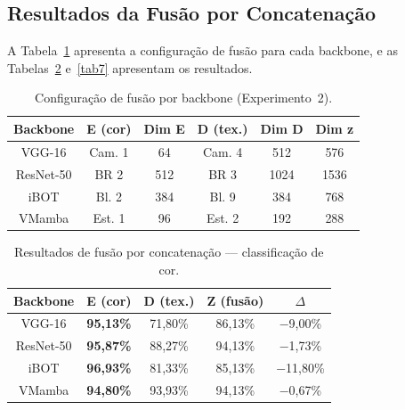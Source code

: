 \documentclass[letterpaper, 10 pt, conference]{ieeeconf}
\begin{document}
\subsection{Resultados da Fusão por Concatenação}

A Tabela~\ref{tab5} apresenta a configuração de fusão para cada backbone,
e as Tabelas~\ref{tab6} e~\ref{tab7} apresentam os resultados.

\begin{table}[htbp]
\caption{Configuração de fusão por backbone (Experimento~2).}
\begin{center}
\begin{tabular}{c|c|c|c|c|c}
\hline
\textbf{Backbone} & \textbf{E (cor)} & \textbf{Dim E}
                  & \textbf{D (tex.)} & \textbf{Dim D} & \textbf{Dim z} \\
\hline
VGG-16    & Cam. 1 & 64  & Cam. 4  & 512  & 576  \\
ResNet-50 & BR 2   & 512 & BR 3    & 1024 & 1536 \\
iBOT      & Bl. 2  & 384 & Bl. 9   & 384  & 768  \\
VMamba    & Est. 1 & 96  & Est. 2  & 192  & 288  \\
\hline
\end{tabular}
\label{tab5}
\end{center}
\end{table}

\begin{table}[htbp]
\caption{Resultados de fusão por concatenação — classificação de cor.}
\begin{center}
\begin{tabular}{c|c|c|c|c}
\hline
\textbf{Backbone} & \textbf{E (cor)} & \textbf{D (tex.)}
                  & \textbf{Z (fusão)} & \textbf{$\Delta$} \\
\hline
VGG-16    & \textbf{95,13\%} & 71,80\% & 86,13\% & $-$9,00\%  \\
ResNet-50 & \textbf{95,87\%} & 88,27\% & 94,13\% & $-$1,73\%  \\
iBOT      & \textbf{96,93\%} & 81,33\% & 85,13\% & $-$11,80\% \\
VMamba    & \textbf{94,80\%} & 93,93\% & 94,13\% & $-$0,67\%  \\
\hline
\end{tabular}
\label{tab6}
\end{center}
\end{table}
\end{document}
